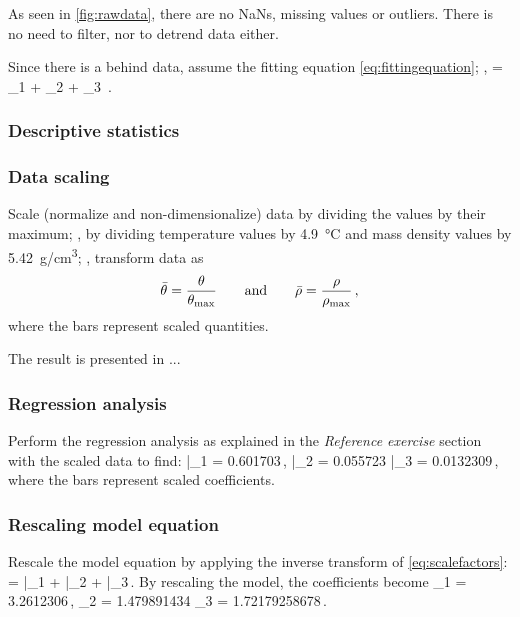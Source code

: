 As seen in \cref{fig:rawdata}, there are no NaNs, missing values or outliers. There is no need to filter, nor to detrend data either.

Since there is a  behind data, assume the fitting equation \cref{eq:fittingequation}; \ie,
%
\beq
    \dens\vat\temp = \alpha_1 + \alpha_2  + \alpha_3 \,.
\eeq


\subsubsection*{Descriptive statistics}
%


\subsubsection*{Data scaling}
%
Scale (normalize and non-dimensionalize) data by dividing the values by their maximum; \ie, by dividing temperature values by \SI{4.9}{\celsius} and mass density values by \SI{5.42}{g/cm^3}; \ie, transform data as
%
\begin{equation}\label{eq:scalefactors}
    \bar{\theta} = \dfrac{\theta}{\theta_{\text{max}}}\qquad\text{and}\qquad
    \bar{\rho} = \dfrac{\rho}{\rho_{\text{max}}}\,, 
\end{equation}
%
where the bars represent scaled quantities.

The result is presented in ...


\subsubsection*{Regression analysis}
%
Perform the regression analysis as explained in the \emph{Reference exercise} section with the scaled data to find:
%
\beq
    \bar\alpha_1 = 0.601703\,,\qquad
    \bar\alpha_2 = 0.055723\qquad{}\qquad
    \bar\alpha_3 = 0.0132309\,,
\eeq
%
where the bars represent scaled coefficients.


\subsubsection*{Rescaling model equation}
%
Rescale the model equation by applying the inverse transform of \cref{eq:scalefactors}:
%
\beq
     = \bar\alpha_1 
                                    + \bar\alpha_2 
                                    + \bar\alpha_3\,.
\eeq
%
By rescaling the model, the coefficients become
%
\beq
    \alpha_1 = 3.2612306\,,\qquad
    \alpha_2 = 1.479891434\qquad{}\qquad
    \alpha_3 = 1.72179258678\,.
\eeq

